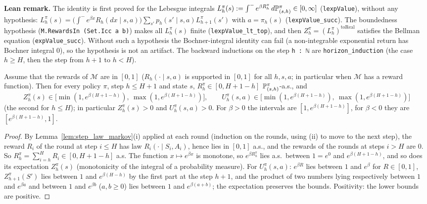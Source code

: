 \textbf{Lean remark.} The identity is first proved for the Lebesgue integrals
$L^\pi_h(s) := \int^- e^{\beta R^\pi_h}\,d\mathbb{P}^\pi_{(s,h)} \in [0, \infty]$ (\texttt{lexpValue}),
without any hypothesis: $L^\pi_h(s) = \big(\int^- e^{\beta x}R_h(dx \mid s, a)\big)\sum_{s'} p_h(s' \mid s, a)L^\pi_{h+1}(s')$
with $a = \pi_h(s)$ (\texttt{lexpValue\_succ}). The boundedness hypothesis
(\texttt{M.RewardsIn (Set.Icc a b)}) makes all $L^\pi_h(s)$ finite
(\texttt{lexpValue\_lt\_top}), and then $Z^\pi_h = (L^\pi_h)^{\mathrm{toReal}}$ satisfies the
Bellman equation (\texttt{expValue\_succ}). Without such a hypothesis the Bochner-integral
identity can fail (a non-integrable exponential return has Bochner integral $0$), so the
hypothesis is not an artifact. The backward inductions on the step \texttt{h : ℕ} are
\texttt{horizon\_induction} (the case $h \ge H$, then the step from $h + 1$ to $h < H$).

\begin{lemma}\label{lem:exp_value_range}
\leanok
{}
Assume that the rewards of $\mathcal M$ are in $[0, 1]$ ($R_h(\cdot \mid s, a)$ is supported in
$[0, 1]$ for all $h, s, a$; in particular when $\mathcal M$ has a reward function). Then for every
policy $\pi$, step $h \le H + 1$ and state $s$, $R^\pi_h \in [0, H + 1 - h]$
$\mathbb{P}^\pi_{(s, h)}$-a.s., and
\[
  Z^\pi_h(s) \in \big[\min(1, e^{\beta(H + 1 - h)}),\ \max(1, e^{\beta(H + 1 - h)})\big],
  \qquad
  U^\pi_h(s, a) \in \big[\min(1, e^{\beta(H + 1 - h)}),\ \max(1, e^{\beta(H + 1 - h)})\big]
\]
(the second for $h \le H$); in particular $Z^\pi_h(s) > 0$ and $U^\pi_h(s, a) > 0$. For
$\beta > 0$ the intervals are $[1, e^{\beta(H+1-h)}]$, for $\beta < 0$ they are
$[e^{\beta(H+1-h)}, 1]$.
\end{lemma}

\begin{proof}
\leanok
By Lemma~\ref{lem:step_law_markov}(i) applied at each round (induction on the rounds, using (ii)
to move to the next step), the reward $R_i$ of the round at step $i \le H$ has law
$R_i(\cdot \mid S_i, A_i)$, hence lies in $[0, 1]$ a.s., and the rewards of the rounds at
steps $i > H$ are $0$. So $R^\pi_h = \sum_{i = h}^H R_i \in [0, H + 1 - h]$ a.s. The function
$x \mapsto e^{\beta x}$ is monotone, so $e^{\beta R^\pi_h}$ lies a.s.\ between $1 = e^{0}$ and
$e^{\beta(H + 1 - h)}$, and so does its expectation $Z^\pi_h(s)$ (monotonicity of the integral of a
probability measure). For $U^\pi_h(s, a)$: $e^{\beta R}$ lies between $1$ and $e^\beta$ for
$R \in [0, 1]$, $Z^\pi_{h+1}(S')$ lies between $1$ and $e^{\beta(H - h)}$ by the first part at the
step $h + 1$, and the product of two numbers lying respectively between $1$ and $e^{\beta a}$
and between $1$ and $e^{\beta b}$ ($a, b \ge 0$) lies between $1$ and $e^{\beta(a + b)}$; the
expectation preserves the bounds. Positivity: the lower bounds are positive.
\end{proof}

